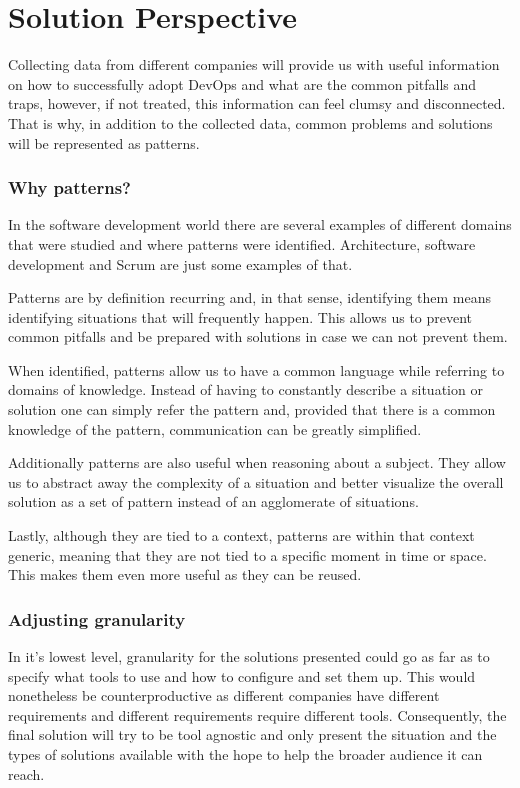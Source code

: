 \chapter{ Solution Perspective } \label{chap:solper}

	Collecting data from different companies will provide us with useful information on how to successfully adopt DevOps and what are the common pitfalls and traps, however, if not treated, this information can feel clumsy and disconnected. That is why, in addition to the collected data, common problems and solutions will be represented as patterns.  
    
    	\subsection{Why patterns?}
      	In the software development world there are several examples of different domains that were studied and where patterns were identified. Architecture, software development and Scrum are just some examples of that.
      
    	Patterns are by definition recurring and, in that sense, identifying them means identifying situations that will frequently happen. This allows us to prevent common pitfalls and be prepared with solutions in case we can not prevent them.
    
   	 	When identified, patterns allow us to have a common language while referring to domains of knowledge. Instead of having to constantly describe a situation or solution one can simply refer the pattern and, provided that there is a common knowledge of the pattern, communication can be greatly simplified.
    
    	Additionally patterns are also useful when reasoning about a subject. They allow us to abstract away the complexity of a situation and better visualize the overall solution as a set of pattern instead of an agglomerate of situations.
    
    	Lastly, although they are tied to a context, patterns are within that context generic, meaning that they are not tied to a specific moment in time or space. This makes them even more useful as they can be reused.
    
    	\subsection{Adjusting granularity}
    	In it's lowest level, granularity for the solutions presented could go as far as to specify what tools to use and how to configure and set them up. This would nonetheless be counterproductive as different companies have different requirements and different requirements require different tools. Consequently, the final solution will try to be tool agnostic and only present the situation and the types of solutions available with the hope to help the broader audience it can reach.

